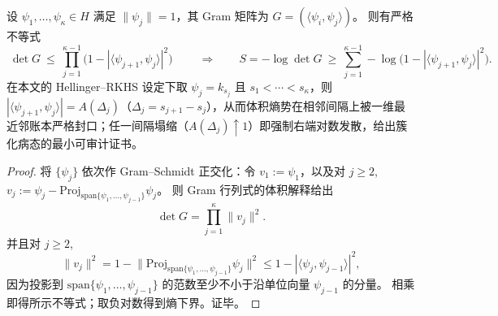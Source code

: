 \begin{proposition}\label{prop:xi-gram-det-nearest-neighbor-product-upper-bound}
设 \(\psi_1,\dots,\psi_\kappa\in H\) 满足 \(\|\psi_j\|=1\)，其 Gram 矩阵为 \(G=(\langle\psi_i,\psi_j\rangle)\)。
则有严格不等式
\[
\boxed{\;
\det G\ \le\ \prod_{j=1}^{\kappa-1}\bigl(1-|\langle\psi_{j+1},\psi_j\rangle|^2\bigr)\;}
\qquad
\Longrightarrow\qquad
S=-\log\det G\ \ge\ \sum_{j=1}^{\kappa-1}-\log\bigl(1-|\langle\psi_{j+1},\psi_j\rangle|^2\bigr).
\]
在本文的 Hellinger--RKHS 设定下取 \(\psi_j=k_{s_j}\) 且 \(s_1<\cdots<s_\kappa\)，则 \(|\langle\psi_{j+1},\psi_j\rangle|=A(\Delta_j)\)（\(\Delta_j=s_{j+1}-s_j\)），从而体积熵势在相邻间隔上被一维最近邻账本严格封口；任一间隔塌缩（\(A(\Delta_j)\uparrow 1\)）即强制右端对数发散，给出簇化病态的最小可审计证书。
\end{proposition}
\begin{proof}
将 \(\{\psi_j\}\) 依次作 Gram--Schmidt 正交化：令
\(
v_1:=\psi_1
\)，以及对 \(j\ge 2\),
\(
v_j:=\psi_j-\mathrm{Proj}_{\mathrm{span}\{\psi_1,\dots,\psi_{j-1}\}}\psi_j
\)。
则 Gram 行列式的体积解释给出
\[
\det G=\prod_{j=1}^{\kappa}\|v_j\|^2.
\]
并且对 \(j\ge 2\),
\[
\|v_j\|^2=1-\bigl\|\mathrm{Proj}_{\mathrm{span}\{\psi_1,\dots,\psi_{j-1}\}}\psi_j\bigr\|^2
\le 1-|\langle\psi_j,\psi_{j-1}\rangle|^2,
\]
因为投影到 \(\mathrm{span}\{\psi_1,\dots,\psi_{j-1}\}\) 的范数至少不小于沿单位向量 \(\psi_{j-1}\) 的分量。
相乘即得所示不等式；取负对数得到熵下界。证毕。
\end{proof}
